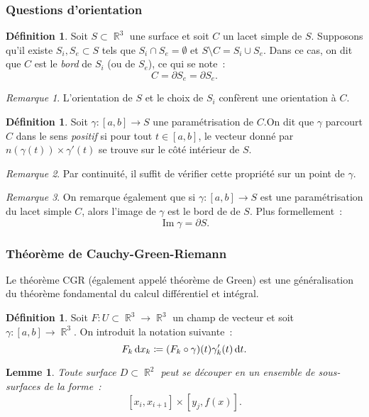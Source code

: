 \documentclass{article}
\DeclareMathOperator{\Imf}{Im}
\DeclareMathOperator{\R}{\mathbb R}
\newtheorem{lem}[thm]{Lemme}
\theoremstyle{definition}
\newtheorem{déf}[thm]{Définition}
\theoremstyle{remark}
\newtheorem*{rmq}{Remarque}
\begin{document}
		\subsubsection{Questions d'orientation}
		\begin{déf} Soit $S \subset \R^3$ une surface et soit $C$ un lacet simple de $S$. Supposons qu'il existe $S_i, S_e \subset S$ tels que
		$S_i \cap S_e = \emptyset$ et $S \setminus C = S_i \cup S_e$. Dans ce cas, on dit que $C$ est le \emph{bord} de $S_i$ (ou de $S_e$), ce qui se note~:
		\[C = \partial S_e = \partial S_e.\]
		\end{déf}

		\begin{rmq} L'orientation de $S$ et le choix de $S_i$ confèrent une orientation à $C$. \end{rmq}

		\begin{déf} Soit $\gamma : [a, b]  \to S$ une paramétrisation de $C$.On dit que $\gamma$ parcourt $C$ dans le sens \emph{positif} si pour tout
		$t \in [a, b]$, le vecteur  donné par $n(\gamma(t)) \times \gamma'(t)$ se trouve sur le côté intérieur de $S$.
		\end{déf}

		\begin{rmq} Par continuité, il suffit de vérifier cette propriété sur un point de $\gamma$. \end{rmq}

		\begin{rmq} On remarque également que si $\gamma : [a, b] \to S$ est une paramétrisation du lacet simple $C$, alors l'image de $\gamma$ est le bord de
		de $S$. Plus formellement~:
		\[\Imf \gamma = \partial S.\]
		\end{rmq}

		\subsubsection{Théorème de Cauchy-Green-Riemann}
		Le théorème CGR (également appelé théorème de Green) est une généralisation du théorème fondamental du calcul différentiel et intégral.

		\begin{déf} Soit $F : U \subset \R^3 \to \R^3$ un champ de vecteur et soit $\gamma : [a, b] \to \R^3$. On introduit la notation suivante~:
		\[F_k\dif x_k \coloneqq (F_k \circ \gamma)(t)\gamma_k'(t)\dif t.\]
		\end{déf}

		\begin{lem}\label{lem:décompositionsurfaces} Toute surface $D \subset \R^2$ peut se \emph{découper} en un ensemble de sous-surfaces de la forme~:
		\[[x_i, x_{i+1}] \times [y_j, f(x)].\]
		\end{lem}
\end{document}
